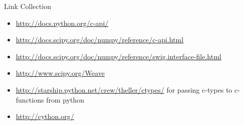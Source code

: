 \documentclass[german]{beamer}
\begin{document}
\begin{frame}{Link Collection}

\begin{itemize}
\item \url{http://docs.python.org/c-api/}
\item \url{http://docs.scipy.org/doc/numpy/reference/c-api.html}
\item \url{http://docs.scipy.org/doc/numpy/reference/swig.interface-file.html}
\item \url{http://www.scipy.org/Weave}
\item \url{http://starship.python.net/crew/theller/ctypes/} for
  passing c-types to c-functions from python
\item \url{http://cython.org/}

\end{itemize}

\end{frame}
\end{document}
